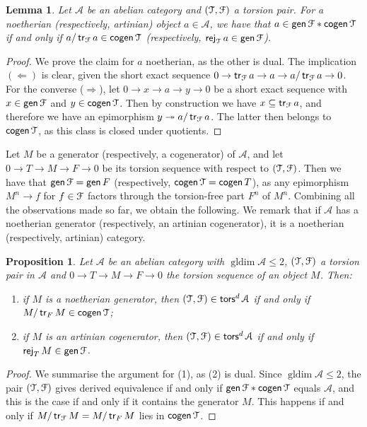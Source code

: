 \documentclass[a4paper,11pt]{amsart}
\theoremstyle{plain}
\newtheorem{prop}[thm]{Proposition}
\newtheorem{lemma}[thm]{Lemma}
\theoremstyle{definition}
\newcommand{\Acal}{\mathcal{A}} \newcommand{\Bcal}{\mathcal{B}} \newcommand{\Ccal}{\mathcal{C}}
\DeclareMathOperator{\gldim}{gldim}
\DeclareMathOperator{\gen}{\mathsf{gen}}
\DeclareMathOperator{\cogen}{\mathsf{cogen}}
\DeclareMathOperator{\tr}{\mathsf{tr}}
\DeclareMathOperator{\rej}{\mathsf{rej}}
\DeclareMathOperator{\tors}{\mathsf{tors}}
\begin{document}
\begin{lemma}
	Let $\Acal$ be an abelian category and $(\mathcal{T},\mathcal{F})$ a torsion pair. For a
	noetherian (respectively, artinian) object $a\in\Acal$, we have that
	$a\in\gen\Fcal\ast\cogen\Tcal$ if and only if $a/\tr_\Fcal a\in\cogen\Tcal$
	(respectively, $\rej_\Tcal a\in\gen\Fcal$).
\end{lemma}

\begin{proof}
	We prove the claim for $a$ noetherian, as the other is dual. The implication
	$(\Leftarrow)$ is clear, given the short exact sequence $0\to \tr_\Fcal a\to
	a\to a/\tr_\Fcal a\to 0$. For the converse ($\Rightarrow$), let $0\to x\to a\to y\to 0$ be a
	short exact sequence with $x\in\gen\Fcal$ and $y\in\cogen\Tcal$. Then by
	construction we have $x\subseteq\tr_\Fcal a$, and therefore we have an
	epimorphism $y\twoheadrightarrow a/\tr_\Fcal a$. The latter then belongs to
	$\cogen\Tcal$, as this class is closed under quotients.
\end{proof}

Let $M$ be a generator (respectively, a cogenerator) of $\Acal$, and
let $0\to T\to M\to F\to 0$ be its torsion sequence with respect to
$(\mathcal{T},\mathcal{F})$. Then we have that $\gen\Fcal=\gen F$ (respectively,
$\cogen\Tcal=\cogen T$), as any epimorphism $M^n\to f$ for $f\in\mathcal{F}$ factors
through the torsion-free part $F^n$ of $M^n$. Combining all the observations
made so far, we obtain the following. We remark that if $\Acal$ has a noetherian
generator (respectively, an artinian cogenerator), it is a noetherian
(respectively, artinian) category.

\begin{prop}\label{prop:gldim2}
	Let $\Acal$ be an abelian category with $\gldim\Acal\leq 2$, $(\mathcal{T},\mathcal{F})$ a
	torsion pair in $\Acal$ and $0\to T\to M\to F\to 0$ the torsion sequence of an
	object $M$. Then:
	\begin{enumerate}
		\item if $M$ is a noetherian generator, then $(\Tcal,\Fcal)\in\tors^d\Acal$
			if and only if $M/\tr_FM\in\cogen\Tcal$;
		\item if $M$ is an artinian cogenerator, then $(\Tcal,\Fcal)\in\tors^d\Acal$
			if and only if $\rej_TM\in\gen\Fcal$.
	\end{enumerate}
\end{prop}

\begin{proof}
	We summarise the argument for (1), as (2) is dual. Since $\gldim\Acal\leq 2$, the
	pair $(\mathcal{T},\mathcal{F})$ gives derived equivalence if and only if
	$\gen\Fcal\ast\cogen\Tcal$ equals $\Acal$, and this is the case if and only if
	it contains the generator $M$. This happens if and only if
	$M/\tr_\Fcal M=M/\tr_FM$ lies in $\cogen\Tcal$.
\end{proof}
\end{document}
